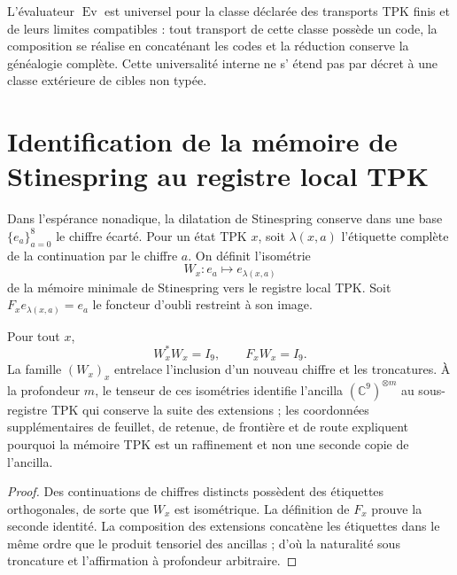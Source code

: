 \begin{corollary}
\label{cor:cpe-universalidad-genealogica}
L'évaluateur \(\operatorname{Ev}\) est universel pour la classe déclarée des
transports TPK finis et de leurs limites compatibles : tout transport de cette
classe possède un code, la composition se réalise en concaténant les codes et la
réduction conserve la généalogie complète. Cette universalité interne ne s'
étend pas par décret à une classe extérieure de cibles non typée.
\end{corollary}

\section{Identification de la mémoire de Stinespring au registre local TPK}
\label{sec:cpe-stinespring-tpk}

Dans l'espérance nonadique, la dilatation de Stinespring conserve dans une base
\(\{e_a\}_{a=0}^8\) le chiffre écarté. Pour un état TPK \(x\), soit
\(\lambda(x,a)\) l'étiquette complète de la continuation par le chiffre
\(a\). On définit l'isométrie
\[
 W_x:e_a\longmapsto e_{\lambda(x,a)}
\]
de la mémoire minimale de Stinespring vers le registre local TPK\@. Soit
\(F_xe_{\lambda(x,a)}=e_a\) le foncteur d'oubli restreint à son image.

\begin{theorem}
\label{thm:cpe-stinespring-tpk}
Pour tout \(x\),
\[
 W_x^*W_x=I_9,
 \qquad F_xW_x=I_9.
\]
La famille \((W_x)_x\) entrelace l'inclusion d'un nouveau chiffre et les
troncatures. À la profondeur \(m\), le tenseur de ces isométries identifie
l'ancilla \((\mathbb C^9)^{\otimes m}\) au sous-registre TPK qui conserve
la suite des extensions ; les coordonnées supplémentaires de feuillet, de retenue,
de frontière et de route expliquent pourquoi la mémoire TPK est un raffinement et non une
seconde copie de l'ancilla.
\end{theorem}

\begin{proof}
Des continuations de chiffres distincts possèdent des étiquettes orthogonales, de sorte
que \(W_x\) est isométrique. La définition de \(F_x\) prouve la seconde
identité. La composition des extensions concatène les étiquettes dans le même
ordre que le produit tensoriel des ancillas ; d'où la naturalité sous
troncature et l'affirmation à profondeur arbitraire.
\end{proof}
